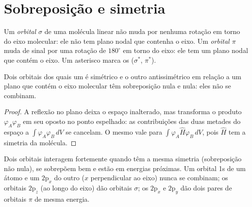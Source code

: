 \section{Sobreposição e simetria}

\begin{definition}\label{def:b2:diatomic-mos:sigma-pi}
Um \emph{orbital $\sigma$} de uma molécula linear não muda por
nenhuma rotação em torno do eixo molecular: ele não tem plano nodal que
contenha o eixo. Um \emph{orbital $\pi$} muda de sinal por
uma rotação de $180^\circ$ em torno do eixo: ele tem um plano nodal que contém
o eixo. Um asterisco marca os  ($\sigma^*$, $\pi^*$).
\end{definition}

\begin{proposition}\label{prop:b2:diatomic-mos:symmetry}
Dois orbitais dos quais um é simétrico e o outro antissimétrico em relação a
um plano que contém o eixo molecular têm sobreposição nula e  nula: eles não se combinam.
\end{proposition}

\begin{proof}
A reflexão no plano deixa o espaço inalterado, mas transforma o produto
$\varphi_A\varphi_B$ em seu oposto no ponto espelhado: as contribuições das
duas metades do espaço a $\int\varphi_A\varphi_B\,dV$ se cancelam. O mesmo vale
para $\int\varphi_A\hat H\varphi_B\,dV$, pois $\hat H$ tem a simetria da molécula.
\end{proof}

Dois orbitais interagem fortemente quando têm a mesma simetria (sobreposição
não nula), se sobrepõem bem e estão em energias próximas. Um orbital 1s de um
átomo e um $2\mathrm p_x$ do outro ($x$ perpendicular ao eixo) nunca se
combinam; os orbitais $2\mathrm p_z$ (ao longo do eixo) dão orbitais $\sigma$;
os $2\mathrm p_x$ e $2\mathrm p_y$ dão dois pares de orbitais $\pi$ de mesma energia.

